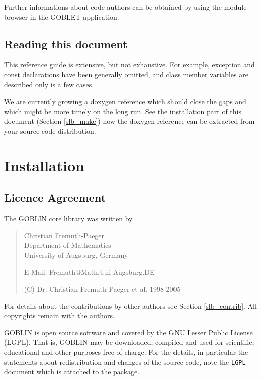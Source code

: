 \documentclass[a4paper,11pt,twoside]{book}
\begin{document}
\begin{multicols}{2}
Further informations about code authors can be obtained by using the module
browser in the GOBLET application.


\section{Reading this document}

This reference guide is extensive, but not exhaustive. For example, exception
and const declarations have been generally omitted, and class member variables
are described only is a few cases.

We are currently growing a doxygen reference which should close the gaps and which
might be more timely on the long run. See the installation part of this document
(Section \ref{slb_make}) how the doxygen reference can be extracted from your
source code distribution.



\cleardoublepage
{}
\chapter{Installation}
\thispagestyle{fancy}
\label{clb11}

\section{Licence Agreement}

The GOBLIN core library was written by
\begin{quote}
Christian Fremuth-Paeger \\
Department of Mathematics \\
University of Augsburg, Germany

\medskip
E-Mail: Fremuth@Math.Uni-Augsburg.DE

\medskip
(C) Dr. Christian Fremuth-Paeger et al. 1998-2005
\end{quote}
For details about the contributions by other authors see Section
\ref{slb_contrib}. All copyrights remain with the authors.

GOBLIN is open source software and covered by the GNU Lesser Public License
(LGPL). That is, GOBLIN may be downloaded, compiled and used for scientific,
educational and other purposes free of charge. For the details, in particular
the statements about redistribution and changes of the source code, note the
\verb/LGPL/ document which is attached to the package.



\end{multicols}
\end{document}
